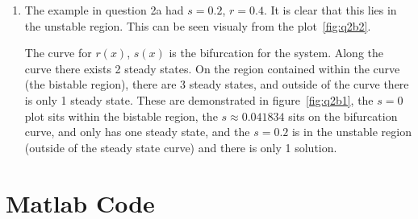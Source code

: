 \documentclass{/home/janmebows/Documents/LatexTemplates/myassignment}
\begin{document}
\begin{enumerate}
\begin{enumerate}
\begin{enumerate}
        
        \item %
        The example in question 2a had $s = 0.2$, $r=0.4$. It is clear that this lies in the unstable region. This can be seen visualy from the plot~\ref{fig:q2b2}.

        The curve for $r(x)$, $s(x)$ is the bifurcation for the system. Along the curve there exists 2 steady states. On the region contained within the curve (the bistable region), there are 3 steady states, and outside of the curve there is only 1 steady state. These are demonstrated in figure~\ref{fig:q2b1}, the $s=0$ plot sits within the bistable region, the $s\approx 0.041834$ sits on the bifurcation curve, and only has one steady state, and the $s=0.2$ is in the unstable region (outside of the steady state curve) and there is only 1 solution.

    \end{enumerate}
    \end{enumerate}
\end{enumerate}

\clearpage

\section*{Matlab Code}


\clearpage

\end{document}
